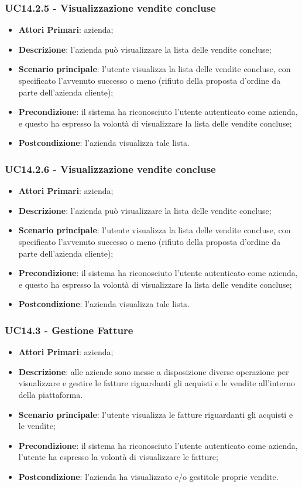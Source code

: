 \subsubsection{UC14.2.5 - Visualizzazione vendite concluse}
\begin{itemize}
	\item \textbf{Attori Primari}: azienda;
	\item \textbf{Descrizione}: l'azienda può visualizzare la lista delle vendite concluse;
	\item \textbf{Scenario principale}: l'utente visualizza la lista delle vendite concluse, con specificato l'avvenuto successo o meno (rifiuto della proposta d'ordine da parte dell'azienda cliente);
	\item \textbf{Precondizione}: il sistema ha riconosciuto l'utente autenticato come azienda, e questo ha espresso la volontà di visualizzare la lista delle vendite concluse;
	\item \textbf{Postcondizione}: l'azienda visualizza tale lista.
\end{itemize}
\subsubsection{UC14.2.6 - Visualizzazione vendite concluse}
\begin{itemize}
	\item \textbf{Attori Primari}: azienda;
	\item \textbf{Descrizione}: l'azienda può visualizzare la lista delle vendite concluse;
	\item \textbf{Scenario principale}: l'utente visualizza la lista delle vendite concluse, con specificato l'avvenuto successo o meno (rifiuto della proposta d'ordine da parte dell'azienda cliente);
	\item \textbf{Precondizione}: il sistema ha riconosciuto l'utente autenticato come azienda, e questo ha espresso la volontà di visualizzare la lista delle vendite concluse;
	\item \textbf{Postcondizione}: l'azienda visualizza tale lista.
\end{itemize}


\subsubsection{UC14.3 - Gestione Fatture}
\begin{itemize}
	\item \textbf{Attori Primari}: azienda;
	\item \textbf{Descrizione}: alle aziende sono messe a disposizione diverse operazione per visualizzare e gestire le fatture riguardanti gli acquisti e le vendite all'interno della piattaforma.
	\item \textbf{Scenario principale}: l'utente visualizza le fatture riguardanti gli acquisti e le vendite;
	 
	\item \textbf{Precondizione}: il sistema ha riconosciuto l'utente autenticato come azienda, l'utente ha espresso la volontà di visualizzare le fatture;
	\item \textbf{Postcondizione}: l'azienda ha visualizzato e/o gestitole proprie vendite.
\end{itemize} 
